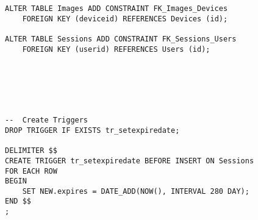 \begin{lstlisting}
ALTER TABLE Images ADD CONSTRAINT FK_Images_Devices 
	FOREIGN KEY (deviceid) REFERENCES Devices (id);

ALTER TABLE Sessions ADD CONSTRAINT FK_Sessions_Users 
	FOREIGN KEY (userid) REFERENCES Users (id);






--  Create Triggers 
DROP TRIGGER IF EXISTS tr_setexpiredate;

DELIMITER $$
CREATE TRIGGER tr_setexpiredate BEFORE INSERT ON Sessions
FOR EACH ROW
BEGIN
	SET NEW.expires = DATE_ADD(NOW(), INTERVAL 280 DAY);
END $$
;


\end{lstlisting}